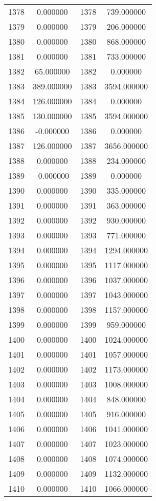 \documentclass[12pt]{article}
\begin{document}
\begin{longtable}{@{}cccc@{}}
1378 & 0.000000 & 1378 & 739.000000 \\
1379 & 0.000000 & 1379 & 206.000000 \\
1380 & 0.000000 & 1380 & 868.000000 \\
1381 & 0.000000 & 1381 & 733.000000 \\
1382 & 65.000000 & 1382 & 0.000000 \\
1383 & 389.000000 & 1383 & 3594.000000 \\
1384 & 126.000000 & 1384 & 0.000000 \\
1385 & 130.000000 & 1385 & 3594.000000 \\
1386 & -0.000000 & 1386 & 0.000000 \\
1387 & 126.000000 & 1387 & 3656.000000 \\
1388 & 0.000000 & 1388 & 234.000000 \\
1389 & -0.000000 & 1389 & 0.000000 \\
1390 & 0.000000 & 1390 & 335.000000 \\
1391 & 0.000000 & 1391 & 363.000000 \\
1392 & 0.000000 & 1392 & 930.000000 \\
1393 & 0.000000 & 1393 & 771.000000 \\
1394 & 0.000000 & 1394 & 1294.000000 \\
1395 & 0.000000 & 1395 & 1117.000000 \\
1396 & 0.000000 & 1396 & 1037.000000 \\
1397 & 0.000000 & 1397 & 1043.000000 \\
1398 & 0.000000 & 1398 & 1157.000000 \\
1399 & 0.000000 & 1399 & 959.000000 \\
1400 & 0.000000 & 1400 & 1024.000000 \\
1401 & 0.000000 & 1401 & 1057.000000 \\
1402 & 0.000000 & 1402 & 1173.000000 \\
1403 & 0.000000 & 1403 & 1008.000000 \\
1404 & 0.000000 & 1404 & 848.000000 \\
1405 & 0.000000 & 1405 & 916.000000 \\
1406 & 0.000000 & 1406 & 1041.000000 \\
1407 & 0.000000 & 1407 & 1023.000000 \\
1408 & 0.000000 & 1408 & 1074.000000 \\
1409 & 0.000000 & 1409 & 1132.000000 \\
1410 & 0.000000 & 1410 & 1066.000000 \\

\end{longtable}
\end{document}
